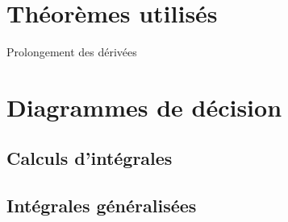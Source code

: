 \begin{subappendices}
\section{Théorèmes utilisés}

\begin{theo}{Prolongement des dérivées}\label{thm:prolongementDesDerivees}
\end{theo}



\section{Diagrammes de décision}

\subsection{Calculs d'intégrales}

\subsection{Intégrales généralisées}


\end{subappendices}


